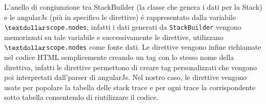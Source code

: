 L'anello di congiunzione tra StackBuilder (la classe che genera i dati per la Stack) e le angularJs (più in specifico le direttive) é rappresentato dalla variabile \texttt{$\textdollar$scope.nodes}, infatti i dati generati da \texttt{StackBuilder} vengono memorizzati su tale variabile e successivamente le direttive, utilizzano \texttt{$\textdollar$scope.nodes} come fonte dati. Le direttive vengono infine richiamate nel codice HTML semplicemente creando un 
tag con lo stesso nome della direttiva, infatti le direttive permettono di creare 
tag personalizzati che vengono poi interpretati dall'parser di angularJs. 
Nel nostro caso, le direttive vengono usate per popolare la tabella delle stack trace 
e per ogni trace la corrispondente sotto tabella consentendo di riutilizzare il codice.